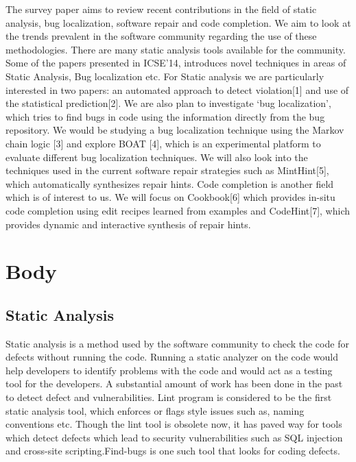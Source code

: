 \documentclass[10pt, conference, compsocconf]{IEEEtran}
\begin{document}
The survey paper aims to review recent contributions in the field of static analysis, bug localization, software repair and code completion. We aim to look at the trends prevalent in the software community regarding the use of these methodologies. There are many static analysis tools available for the community. Some of the papers presented in ICSE’14, introduces novel techniques in areas of Static Analysis, Bug localization etc. For Static analysis we are particularly interested in two papers: an automated approach to detect violation[1] and use of the statistical prediction[2]. We are also plan to investigate ‘bug localization’, which tries to find bugs in code using the information directly from the bug repository. We would be studying a bug localization technique using the Markov chain logic [3] and explore BOAT [4], which is an experimental platform to evaluate different bug localization techniques. We will also look into the techniques used in the current software repair strategies such as MintHint[5], which automatically synthesizes repair hints. Code completion is another field which is of interest to us. We will focus on Cookbook[6] which provides in-situ code completion using edit recipes learned from examples and CodeHint[7], which provides dynamic and interactive synthesis of repair hints.

\section{Body}
\subsection{Static Analysis}
Static analysis is a method used by the software community to check the code for defects without running the code. Running a static analyzer on the code would help developers to identify problems with the code and would act as a testing tool for the developers. A substantial amount of work has been done in the past to detect defect and vulnerabilities. Lint program is considered to be the first static analysis tool, which enforces or flags style issues such as, naming conventions etc. Though the lint tool is obsolete now, it has paved way for tools which detect defects which lead to security vulnerabilities such as SQL injection and cross-site scripting.Find-bugs is one such tool that looks for coding defects\cite{ayewah2008using}. 
\end{document}
